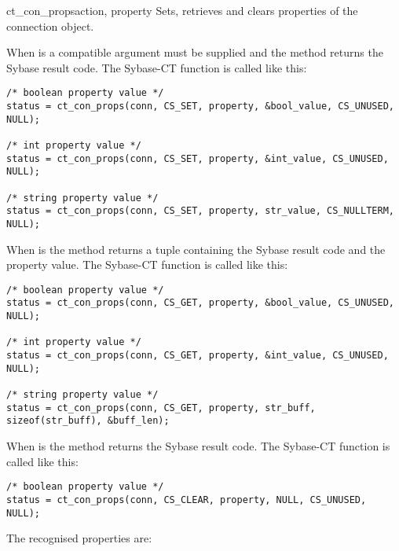\begin{methoddesc}[CS_CONNECTION]{ct_con_props}{action, property }
Sets, retrieves and clears properties of the connection object.

When  is  a compatible  argument
must be supplied and the method returns the Sybase result code.  The
Sybase-CT  function is called like this:

\begin{verbatim}
/* boolean property value */
status = ct_con_props(conn, CS_SET, property, &bool_value, CS_UNUSED, NULL);

/* int property value */
status = ct_con_props(conn, CS_SET, property, &int_value, CS_UNUSED, NULL);

/* string property value */
status = ct_con_props(conn, CS_SET, property, str_value, CS_NULLTERM, NULL);
\end{verbatim}

When  is  the method returns a tuple
containing the Sybase result code and the property value.  The
Sybase-CT  function is called like this:

\begin{verbatim}
/* boolean property value */
status = ct_con_props(conn, CS_GET, property, &bool_value, CS_UNUSED, NULL);

/* int property value */
status = ct_con_props(conn, CS_GET, property, &int_value, CS_UNUSED, NULL);

/* string property value */
status = ct_con_props(conn, CS_GET, property, str_buff, sizeof(str_buff), &buff_len);
\end{verbatim}

When  is  the method returns the Sybase
result code.  The Sybase-CT  function is
called like this:

\begin{verbatim}
/* boolean property value */
status = ct_con_props(conn, CS_CLEAR, property, NULL, CS_UNUSED, NULL);
\end{verbatim}

The recognised properties are:


\end{methoddesc}
